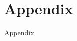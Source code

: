 \documentclass[12pt,aspectratio=169,xcolor=dvipsnames]{beamer}						%
\begin{document}
\section{Appendix}

\begin{frame}
	\begin{center}
		\huge \textcolor{yaleblue}{Appendix}
	\end{center}
\end{frame}

%	 
%	
\end{document}

